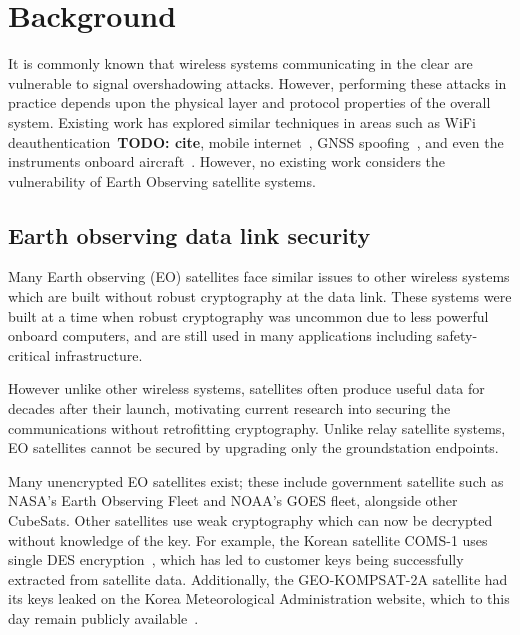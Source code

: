 \section{Background}\label{sec:background}

It is commonly known that wireless systems communicating in the clear are vulnerable to signal overshadowing attacks.
However, performing these attacks in practice depends upon the physical layer and protocol properties of the overall system.
Existing work has explored similar techniques in areas such as WiFi deauthentication~\textbf{TODO: cite}, mobile internet~\cite{yang2019hiding,erni2021adaptover}, GNSS spoofing~\cite{tippenhauer2011requirements}, and even the instruments onboard aircraft~\cite{sathayeWireless2019}.
However, no existing work considers the vulnerability of Earth Observing satellite systems.


\subsection{Earth observing data link security}

Many Earth observing (EO) satellites face similar issues to other wireless systems which are built without robust cryptography at the data link.
These systems were built at a time when robust cryptography was uncommon due to less powerful onboard computers, and are still used in many applications including safety-critical infrastructure.

However unlike other wireless systems, satellites often produce useful data for decades after their launch, motivating current research into securing the communications without retrofitting cryptography.
Unlike relay satellite systems, EO satellites cannot be secured by upgrading only the groundstation endpoints.

Many unencrypted EO satellites exist; these include government satellite such as NASA's Earth Observing Fleet and NOAA's GOES fleet, alongside other CubeSats.
Other satellites use weak cryptography which can now be decrypted without knowledge of the key.
For example, the Korean satellite COMS-1 uses single DES encryption~\cite{lrit-key-dec}, which has led to customer keys being successfully extracted from satellite data.
Additionally, the GEO-KOMPSAT-2A satellite had its keys leaked on the Korea Meteorological Administration website, which to this day remain publicly available~\cite{xrit-rx}.

